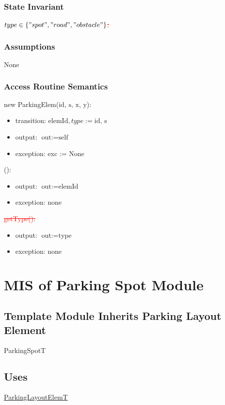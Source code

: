 \documentclass[12pt, titlepage]{article}
\begin{document}
\subsubsection{State Invariant}
\textcolor{red}{\st{$type \in \{"spot", "road", "obstacle"\}$.}}

\subsubsection{Assumptions}
None

\subsubsection{Access Routine Semantics}

\noindent new ParkingElem($\text{id, s, x, y}$):
\begin{itemize}
\item transition: $\text{elemId}, type :=  \text{id, s}$
\item output: $\text{out} := \text{self}$
\item exception: exc := None
\end{itemize}

\noindent {}():
\begin{itemize} 
\item output: $\text{out} := \text{elemId}$
\item exception: none
\end{itemize}

\noindent \textcolor{red}{\st{getType():}}
\begin{itemize} 
\item output: $\text{out} := \text{type}$
\item exception: none
\end{itemize}

\newpage

\section{MIS of Parking Spot Module} 
\label{parkingSpot:Module}

\subsection{Template Module Inherits Parking Layout Element}
ParkingSpotT

\subsection{Uses}
\hyperref[parkingLayoutElem:Module]{ParkingLayoutElemT}
\end{document}
